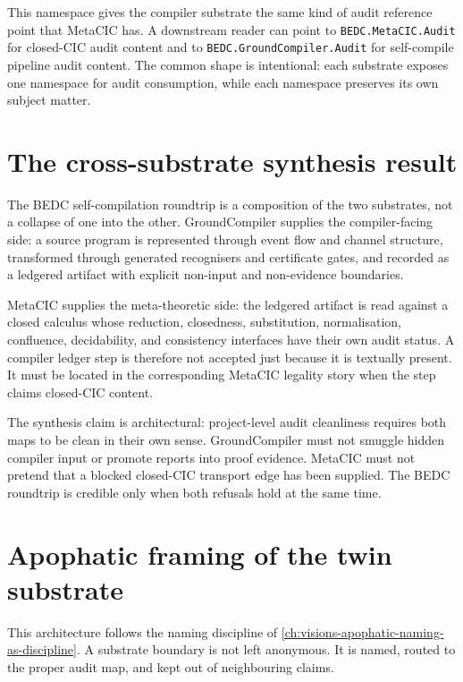 This namespace gives the compiler substrate the same kind of audit reference
point that MetaCIC has. A downstream reader can point to
\texttt{BEDC.MetaCIC.Audit} for closed-CIC audit content and to
\texttt{BEDC.GroundCompiler.Audit} for self-compile pipeline audit content.
The common shape is intentional: each substrate exposes one namespace for
audit consumption, while each namespace preserves its own subject matter.

\section{The cross-substrate synthesis result}
\label{sec:twin-substrate-synthesis-cross-result}

The BEDC self-compilation roundtrip is a composition of the two substrates,
not a collapse of one into the other. GroundCompiler supplies the
compiler-facing side: a source program is represented through event flow and
channel structure, transformed through generated recognisers and certificate
gates, and recorded as a ledgered artifact with explicit non-input and
non-evidence boundaries.

MetaCIC supplies the meta-theoretic side: the ledgered artifact is read
against a closed calculus whose reduction, closedness, substitution,
normalisation, confluence, decidability, and consistency interfaces have
their own audit status. A compiler ledger step is therefore not accepted just
because it is textually present. It must be located in the corresponding
MetaCIC legality story when the step claims closed-CIC content.

The synthesis claim is architectural: project-level audit cleanliness requires
both maps to be clean in their own sense. GroundCompiler must not smuggle
hidden compiler input or promote reports into proof evidence. MetaCIC must not
pretend that a blocked closed-CIC transport edge has been supplied. The BEDC
roundtrip is credible only when both refusals hold at the same time.

\section{Apophatic framing of the twin substrate}
\label{sec:twin-substrate-synthesis-apophatic}

This architecture follows the naming discipline of
\autoref{ch:visions-apophatic-naming-as-discipline}. A substrate boundary is
not left anonymous. It is named, routed to the proper audit map, and kept out
of neighbouring claims.

